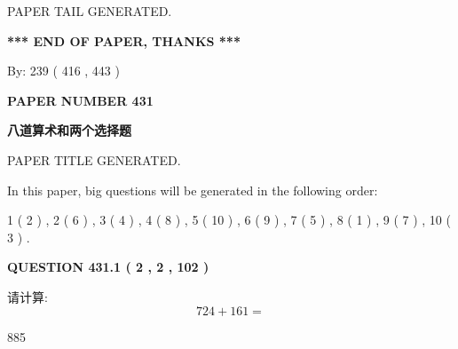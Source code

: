 \documentclass{ctexart}
\begin{document}
   
   
\vspace{2.0in} PAPER TAIL GENERATED.
   
   
   
   
\vspace{1.0in} 
{\textbf{\large{ *** END OF PAPER, THANKS *** }}} 
   
   
\hspace{1.0in} By: 
 239 ( 416 ,  443 )
   
   
   
   
\newpage 
\setcounter{page}{ 
   431001 } 
   
   
   
   
 {\textbf{ \Large{ PAPER NUMBER  431  }}}
   
   
\vspace{0.2in}
   
   
   
   
   
   
   
   
 \vspace{0.2in}
{\LARGE {\textbf{ 八道算术和两个选择题}}}
   
   
 PAPER TITLE GENERATED.
   
   
   
\vspace{0.2in}
   
In this paper, big questions will be generated in the following order: 
   
   
   1 ( 2 )
 ,
   2 ( 6 )
 ,
   3 ( 4 )
 ,
   4 ( 8 )
 ,
   5 ( 10 )
 ,
   6 ( 9 )
 ,
   7 ( 5 )
 ,
   8 ( 1 )
 ,
   9 ( 7 )
 ,
   10 ( 3 )
 .
  
\vspace{0.2in}
  
{\textbf{\Large{QUESTION
431.1 
 ( 2 , 2 , 102 )
}}}
  
  
 
请计算:
\begin{equation}
724 +  %
161 = \nonumber
\end{equation}
 
 
 
\noindent{}
 
 

885
 
 
\noindent{}
 
\end{document}
